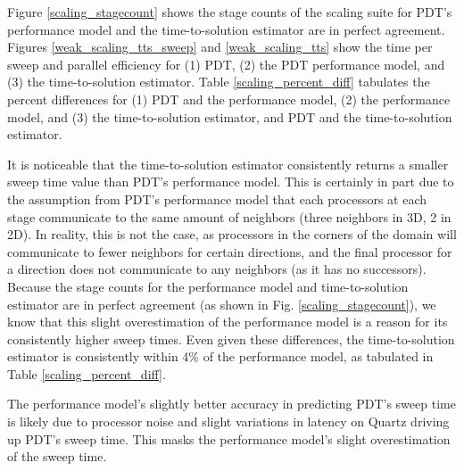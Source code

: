 Figure \ref{scaling_stagecount} shows the stage counts of the scaling suite for PDT's performance model and the time-to-solution estimator are in perfect agreement.
Figures \ref{weak_scaling_tts_sweep} and \ref{weak_scaling_tts} show the time per sweep and parallel efficiency for (1) PDT, (2) the PDT performance model, and (3) the time-to-solution estimator. Table \ref{scaling_percent_diff} tabulates the percent differences for (1) PDT and the performance model, (2) the performance model, and (3) the time-to-solution estimator, and PDT and the time-to-solution estimator. 

It is noticeable that the time-to-solution estimator consistently returns a smaller sweep time value than PDT's performance model. This is certainly in part due to the assumption from PDT's performance model that each processors at each stage communicate to the same amount of neighbors (three neighbors in 3D, 2 in 2D). 
In reality, this is not the case, as processors in the corners of the domain will communicate to fewer neighbors for certain directions, and the final processor for a direction does not communicate to any neighbors (as it has no successors).
Because the stage counts for the performance model and time-to-solution estimator are in perfect agreement (as shown in Fig. \ref{scaling_stagecount}), we know that this slight overestimation of the performance model is a reason for its consistently higher sweep times.
Even given these differences, the time-to-solution estimator is consistently within 4\% of the performance model, as tabulated in Table \ref{scaling_percent_diff}.

The performance model's slightly better accuracy in predicting PDT's sweep time is likely due to processor noise and slight variations in latency on Quartz driving up PDT's sweep time. This masks the performance model's slight overestimation of the sweep time.

